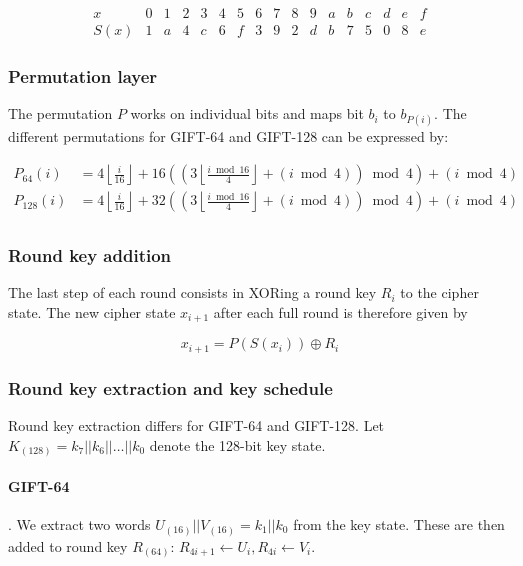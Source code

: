 \[
    \begin{array}{l|cccccccccccccccc}
        x & 0 & 1 & 2 & 3 & 4 & 5 & 6 & 7 & 8 & 9 & a & b & c & d & e & f \\
        \hline
        S(x) & 1 & a & 4 & c & 6 & f & 3 & 9 & 2 & d & b & 7 & 5 & 0 & 8 & e
    \end{array}
\]

\subsubsection{Permutation layer}

The permutation $P$ works on individual bits and maps bit $b_i$ to $b_{P(i)}$.
The different permutations for GIFT-64 and GIFT-128 can be expressed by:

\begin{align*}
    P_{64}(i)&=4\left\lfloor\frac{i}{16}\right\rfloor+16\left(\left(3\left\lfloor\frac{i\bmod 16}{4}\right\rfloor+(i\bmod 4)\right)\bmod 4\right)+(i\bmod 4) \\
    P_{128}(i)&=4\left\lfloor\frac{i}{16}\right\rfloor+32\left(\left(3\left\lfloor\frac{i\bmod 16}{4}\right\rfloor+(i\bmod 4)\right)\bmod 4\right)+(i\bmod 4) \\
\end{align*}

\subsubsection{Round key addition}

The last step of each round consists in XORing a round key $R_{i}$ to the cipher
state. The new cipher state $x_{i+1}$ after each full round is therefore given
by

\[
    x_{i+1}=P(S(x_i))\oplus R_i
\]

\subsubsection{Round key extraction and key schedule}

Round key extraction differs for GIFT-64 and GIFT-128. Let
$K_{(128)}=k_7||k_6||\dots||k_0$ denote the 128-bit key state.

\paragraph{GIFT-64}. We extract two words $U_{(16)}||V_{(16)}=k_1||k_0$ from the key
state. These are then added to round key $R_{(64)}$: $R_{4i+1}\leftarrow
U_i,R_{4i}\leftarrow V_i$.

